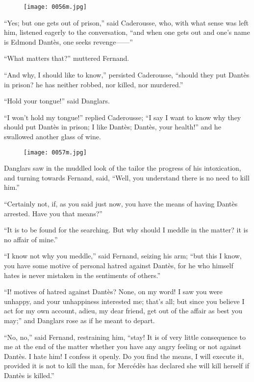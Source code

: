 \begin{figure}[ht]
\texttt{[image: 0056m.jpg]}
\end{figure}

“Yes; but one gets out of prison,” said Caderousse, who, with what
sense was left him, listened eagerly to the conversation, “and when one
gets out and one’s name is Edmond Dantès, one seeks revenge——”

“What matters that?” muttered Fernand.

“And why, I should like to know,” persisted Caderousse, “should they
put Dantès in prison? he has neither robbed, nor killed, nor murdered.”

“Hold your tongue!” said Danglars.

“I won’t hold my tongue!” replied Caderousse; “I say I want to know why
they should put Dantès in prison; I like Dantès; Dantès, your health!”
and he swallowed another glass of wine.

\begin{figure}[ht]
\texttt{[image: 0057m.jpg]}
\end{figure}

Danglars saw in the muddled look of the tailor the progress of his
intoxication, and turning towards Fernand, said, “Well, you understand
there is no need to kill him.”

“Certainly not, if, as you said just now, you have the means of having
Dantès arrested. Have you that means?”

“It is to be found for the searching. But why should I meddle in the
matter? it is no affair of mine.”

“I know not why you meddle,” said Fernand, seizing his arm; “but this I
know, you have some motive of personal hatred against Dantès, for he
who himself hates is never mistaken in the sentiments of others.”

“I! motives of hatred against Dantès? None, on my word! I saw you were
unhappy, and your unhappiness interested me; that’s all; but since you
believe I act for my own account, adieu, my dear friend, get out of the
affair as best you may;” and Danglars rose as if he meant to depart.

“No, no,” said Fernand, restraining him, “stay! It is of very little
consequence to me at the end of the matter whether you have any angry
feeling or not against Dantès. I hate him! I confess it openly. Do you
find the means, I will execute it, provided it is not to kill the man,
for Mercédès has declared she will kill herself if Dantès is killed.”

